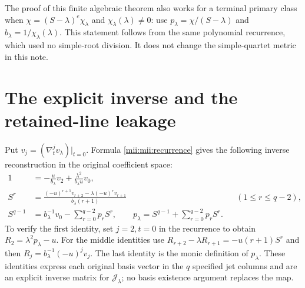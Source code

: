 The proof of this finite algebraic theorem also works for a
terminal primary class when
$\chi=(S-\lambda)^e\chi_\lambda$ and $\chi_\lambda(\lambda)\ne0$:
use $p_\lambda=\chi/(S-\lambda)$ and
$b_\lambda=1/\chi_\lambda(\lambda)$. This statement follows from
the same polynomial recurrence, which used no simple-root
division. It does not change the simple-quartet metric in this note.

\section{The explicit inverse and the retained-line leakage}
Put $v_j=(\nabla_t^j v_\lambda)|_{t=0}$. Formula
\eqref{mii:mii:recurrence} gives the following inverse reconstruction
in the original coefficient space:
\begin{equation}\tag{MII22}\label{mii:mii:inverse}
 \begin{aligned}
 1&=-\frac{u}{b_\lambda}v_2
            +\frac{\lambda^2}{b_\lambda u}v_0,\\
 S^r&=\frac{(-u)^{r+1}v_{r+2}
                    -\lambda(-u)^r v_{r+1}}{b_\lambda(r+1)}
                &&(1\le r\le q-2),\\
 S^{q-1}&=b_\lambda^{-1}v_0-
                         \sum_{r=0}^{q-2}p_rS^r,
 \qquad p_\lambda=S^{q-1}+\sum_{r=0}^{q-2}p_rS^r.
 \end{aligned}
\end{equation}
To verify the first identity, set $j=2,t=0$ in the recurrence to
obtain $R_2=\lambda^2p_\lambda-u$. For the middle identities use
$R_{r+2}-\lambda R_{r+1}=-u(r+1)S^r$ and then
$R_j=b_\lambda^{-1}(-u)^jv_j$. The last identity is the monic
definition of $p_\lambda$. These identities express each original
basis vector in the $q$ specified jet columns and are an explicit
inverse matrix for $\mathcal J_\lambda$; no basis existence argument
replaces the map.

